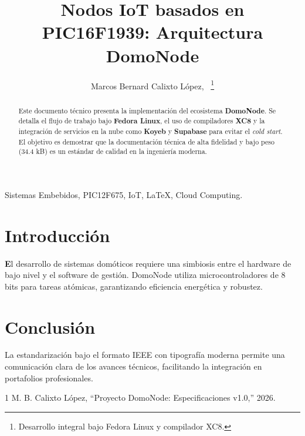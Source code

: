 \documentclass[journal,10pt]{IEEEtran}
\newcommand{\IEEEPARSTART}[2]{{\large\sffamily\textbf{#1}}#2}
\begin{document}
\title{\sffamily Nodos IoT basados en PIC16F1939: Arquitectura DomoNode}

\author{Marcos Bernard Calixto López,~%
\thanks{Desarrollo integral bajo Fedora Linux y compilador XC8.}}

\maketitle
\thispagestyle{IEEEtitlepagestyle}

\begin{abstract}
{\sffamily\fontsize{9.5pt}{12pt}\selectfont
Este documento técnico presenta la implementación del ecosistema \textbf{DomoNode}. Se detalla el flujo de trabajo bajo \textbf{Fedora Linux}, el uso de compiladores \textbf{XC8} y la integración de servicios en la nube como \textbf{Koyeb} y \textbf{Supabase} para evitar el \textit{cold start}. El objetivo es demostrar que la documentación técnica de alta fidelidad y bajo peso (34.4 kB) es un estándar de calidad en la ingeniería moderna.}
\end{abstract}

\begin{IEEEkeywords}
{\sffamily Sistemas Embebidos, PIC12F675, IoT, LaTeX, Cloud Computing.}
\end{IEEEkeywords}

\section{\sffamily Introducción}
\IEEEPARSTART{E}{l} desarrollo de sistemas domóticos requiere una simbiosis entre el hardware de bajo nivel y el software de gestión. DomoNode utiliza microcontroladores de 8 bits para tareas atómicas, garantizando eficiencia energética y robustez.

\section{\sffamily Conclusión}
La estandarización bajo el formato IEEE con tipografía moderna permite una comunicación clara de los avances técnicos, facilitando la integración en portafolios profesionales.

\begin{thebibliography}{1}
M. B. Calixto López, ``Proyecto DomoNode: Especificaciones v1.0,'' 2026.
\end{thebibliography}
\end{document}
